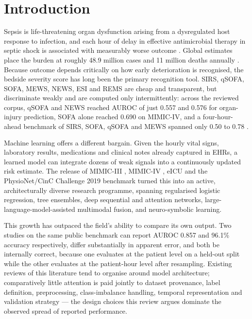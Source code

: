 \documentclass[conference]{IEEEtran}
\begin{document}
\section{Introduction}

Sepsis is life-threatening organ dysfunction arising from a dysregulated host response to infection, and each hour of delay in effective antimicrobial therapy in septic shock is associated with measurably worse outcome \cite{r1,r3}. Global estimates place the burden at roughly 48.9 million cases and 11 million deaths annually \cite{r2}. Because outcome depends critically on how early deterioration is recognised, the bedside severity score has long been the primary recognition tool. SIRS, qSOFA, SOFA, MEWS, NEWS, ESI and REMS are cheap and transparent, but discriminate weakly and are computed only intermittently: across the reviewed corpus, qSOFA and NEWS reached AUROC of just 0.557 and 0.576 for organ-injury prediction, SOFA alone reached 0.690 on MIMIC-IV, and a four-hour-ahead benchmark of SIRS, SOFA, qSOFA and MEWS spanned only 0.50 to 0.78 \cite{r16,r17,r22,r23}.

Machine learning offers a different bargain. Given the hourly vital signs, laboratory results, medications and clinical notes already captured in EHRs, a learned model can integrate dozens of weak signals into a continuously updated risk estimate. The release of MIMIC-III \cite{r4}, MIMIC-IV \cite{r5}, eICU \cite{r6} and the PhysioNet/CinC Challenge 2019 benchmark \cite{r7} turned this into an active, architecturally diverse research programme, spanning regularised logistic regression, tree ensembles, deep sequential and attention networks, large-language-model-assisted multimodal fusion, and neuro-symbolic learning.

This growth has outpaced the field's ability to compare its own output. Two studies on the same public benchmark can report AUROC 0.857 and 96.1\% accuracy respectively, differ substantially in apparent error, and both be internally correct, because one evaluates at the patient level on a held-out split while the other evaluates at the patient-hour level after resampling. Existing reviews of this literature tend to organise around model architecture; comparatively little attention is paid jointly to dataset provenance, label definition, preprocessing, class-imbalance handling, temporal representation and validation strategy --- the design choices this review argues dominate the observed spread of reported performance.
\end{document}
